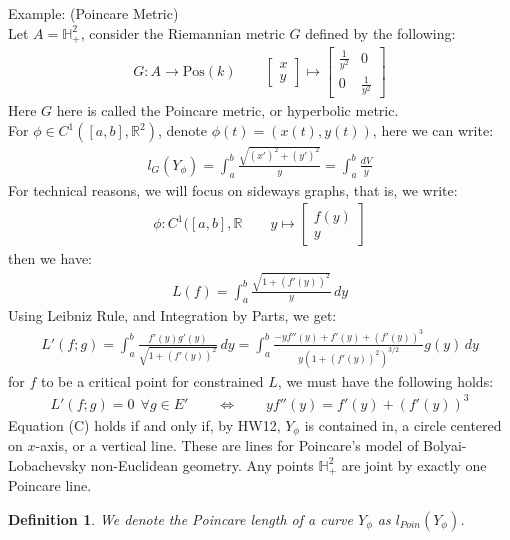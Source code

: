 \documentclass[15pt]{book}
\theoremstyle{break}
\theoremstyle{break}
\newtheorem{defn}{Definition}[corL]
\newcommand{\R}{\mathbb{R}}
\newcommand{\bmat}[1]{\begin{bmatrix} #1 \end{bmatrix}}
\newcommand{\example}{\color{green}Example: \color{black}}
\begin{document}
\example (Poincare Metric)\\
Let $A = \mathbb{H}_+^2$, consider the Riemannian metric $G$ defined by the following:
\begin{align*}
G:A \to \text{Pos}(k) \qquad \bmat{x\\y}\mapsto \bmat{\frac{1}{y^2} & 0 \\ 0 & \frac{1}{y^2}}
\end{align*}
Here $G$ here is called the Poincare metric, or hyperbolic metric. \\
For $\phi\in C^1([a,b], \R^2)$, denote $\phi(t) = (x(t),y(t))$, here we can write:
\begin{align*}
l_G(Y_{\phi}) = \int_a^b \frac{\sqrt{(x')^2 + (y')^2}}{y} = \int_a^b \frac{dV}{y}
\end{align*}
For technical reasons, we will focus on sideways graphs, that is, we write:
\begin{align*}
\phi:C^1([a,b], \R \qquad y \mapsto \bmat{f(y) \\ y}
\end{align*}
then we have:
\begin{align*}
L(f) = \int_a^b \frac{\sqrt{1+(f'(y))^2}}{y}\, dy
\end{align*}
Using Leibniz Rule, and Integration by Parts, we get:
\begin{align*}
L'(f;g) = \int_a^b \frac{f'(y) g'(y)}{\sqrt{1+ (f'(y))^2}}\, dy = \int_a^b  \frac{-y f''(y) + f'(y) + (f'(y))^3}{y(1+(f'(y))^2)^{3/2}}g(y)\, dy
\end{align*}
for $f$ to be a critical point for constrained $L$, we must have the following holds:
\begin{align*}
L'(f;g) = 0 \ \ \forall g \in E' \qquad \iff \qquad yf''(y) = f'(y) + (f'(y))^3  \tag{C}
\end{align*}
Equation (C) holds if and only if, by HW12, $Y_{\phi}$ is contained in, a circle centered on $x$-axis, or a vertical line. These are lines for Poincare's model of Bolyai-Lobachevsky non-Euclidean geometry. Any points $\mathbb{H}_+^2$ are joint by exactly one Poincare line. \\

\begin{defn}
We denote the Poincare length of a curve $Y_{\phi}$ as $l_{Poin}(Y_\phi)$.
\end{defn}
\end{document}
